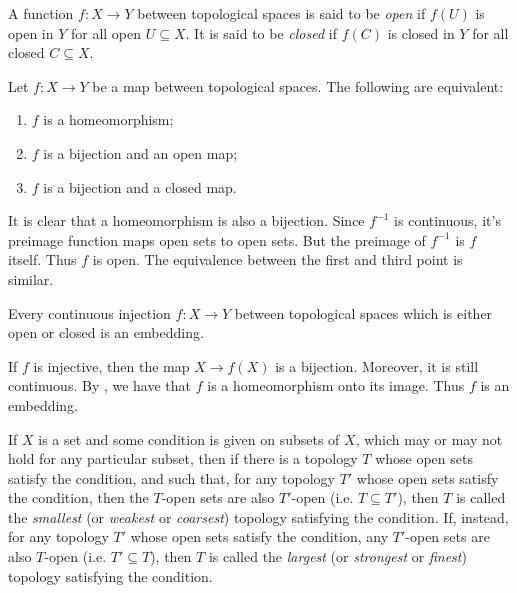 \documentclass[letterpaper, 11pt, oneside]{book}
\begin{document}
\begin{defn}
  A function $f\colon X \to Y$ between topological spaces is said to be \emph{open} if $f(U)$ is open in $Y$ for all open $U \subseteq X$.
  It is said to be \emph{closed} if $f(C)$ is closed in $Y$ for all closed $C \subseteq X$.
\end{defn}

\clearpage

\begin{prop}\label{prop: homeo_is_open_and_closed_bij}
  Let $f\colon X \to Y$ be a map between topological spaces.
  The following are equivalent:
  \begin{enumerate}
  \item $f$ is a homeomorphism;
  \item $f$ is a bijection and an open map;
  \item $f$ is a bijection and a closed map.
  \end{enumerate}
\end{prop}
\begin{pf}
  It is clear that a homeomorphism is also a bijection.
  Since $f^{-1}$ is continuous, it's preimage function maps open sets to open sets.
  But the preimage of $f^{-1}$ is $f$ itself.
  Thus $f$ is open.
  The equivalence between the first and third point is similar.
\end{pf}

\begin{prop}
  Every continuous injection $f\colon X \to Y$ between topological spaces which is either open or closed is an embedding.
\end{prop}
\begin{pf}
  If $f$ is injective, then the map $X \to f(X)$ is a bijection.
  Moreover, it is still continuous.
  By , we have that $f$ is a homeomorphism onto its image.
  Thus $f$ is an embedding.
\end{pf}

\begin{defn}
  If $X$ is a set and some condition is given on subsets of $X$, which may or may not hold for any particular subset, then if there is a topology $T$ whose open sets satisfy the condition, and such that, for any topology $T'$ whose open sets satisfy the condition, then the $T$-open sets are also $T'$-open (i.e. $T \subseteq T'$), then $T$ is called the \emph{smallest} (or \emph{weakest} or \emph{coarsest}) topology satisfying the condition.
  If, instead, for any topology $T'$ whose open sets satisfy the condition, any $T'$-open sets are also $T$-open (i.e. $T' \subseteq T$), then $T$ is called the \emph{largest} (or \emph{strongest} or \emph{finest}) topology satisfying the condition.
\end{defn}
\end{document}
